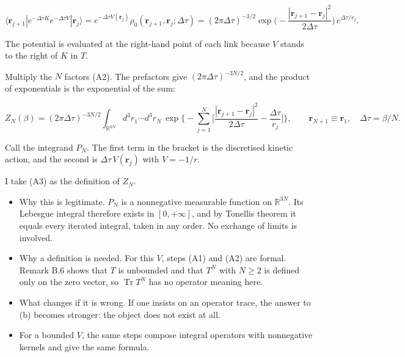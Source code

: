 \documentclass[11pt,a4paper]{article}
\newcommand{\tagmark}[1]{\marginnote{\scriptsize\ttfamily #1}}
\providecommand{\tightlist}{\setlength{\itemsep}{0pt}\setlength{\parskip}{0pt}}
\begin{document}
\begin{equation}
\langle\mathbf r_{j+1}|e^{-\Delta\tau K}e^{-\Delta\tau V}|\mathbf r_j\rangle=e^{-\Delta\tau V(\mathbf r_j)}\rho_0(\mathbf r_{j+1},\mathbf r_j;\Delta\tau)=(2\pi\Delta\tau)^{-3/2}\exp\Big(-\frac{|\mathbf r_{j+1}-\mathbf r_j|^2}{2\Delta\tau}\Big)\,e^{\Delta\tau/r_j}.\tag{A2}
\end{equation}

The potential is evaluated at the right-hand point of each link because \(V\) stands to the right of \(K\) in \(T\).

\tagmark{[D]} Multiply the \(N\) factors (A2). The prefactors give \((2\pi\Delta\tau)^{-3N/2}\), and the product of exponentials is the exponential of the sum:

\begin{equation}
Z_N(\beta)=(2\pi\Delta\tau)^{-3N/2}\int_{\mathbb R^{3N}}d^3r_1\cdots d^3r_N\,\exp\Big\{-\sum_{j=1}^{N}\Big[\frac{|\mathbf r_{j+1}-\mathbf r_j|^2}{2\Delta\tau}-\frac{\Delta\tau}{r_j}\Big]\Big\},\qquad \mathbf r_{N+1}\equiv\mathbf r_1,\quad\Delta\tau=\beta/N.\tag{A3}
\end{equation}

Call the integrand \(P_N\). The first term in the bracket is the discretised kinetic action, and the second is \(\Delta\tau\,V(\mathbf r_j)\) with \(V=-1/r\).

\tagmark{[A1]} I take (A3) as the definition of \(Z_N\).

\begin{itemize}
\tightlist
\item
  Why this is legitimate. \(P_N\) is a nonnegative measurable function on \(\mathbb R^{3N}\). Its Lebesgue integral therefore exists in \([0,+\infty]\), and by Tonelli\textquotesingle s theorem it equals every iterated integral, taken in any order. No exchange of limits is involved.
\item
  Why a definition is needed. For this \(V\), steps (A1) and (A2) are formal. Remark B.6 shows that \(T\) is unbounded and that \(T^N\) with \(N\ge2\) is defined only on the zero vector, so \(\operatorname{Tr}T^N\) has no operator meaning here.
\item
  What changes if it is wrong. If one insists on an operator trace, the answer to (b) becomes stronger: the object does not exist at all.
\item
  For a bounded \(V\), the same steps compose integral operators with nonnegative kernels and give the same formula.
\end{itemize}
\end{document}
